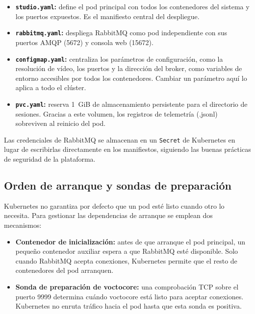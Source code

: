 \begin{itemize}
  \item \textbf{\texttt{studio.yaml}:} define el pod principal con todos los contenedores
        del sistema y los puertos expuestos. Es el manifiesto central del despliegue.
  \item \textbf{\texttt{rabbitmq.yaml}:} despliega RabbitMQ como pod independiente con
        sus puertos AMQP (5672) y consola web (15672).
  \item \textbf{\texttt{configmap.yaml}:} centraliza los parámetros de configuración,
        como la resolución de vídeo, los puertos y la dirección del broker, como
        variables de entorno accesibles por todos los contenedores. Cambiar un parámetro
        aquí lo aplica a todo el clúster.
  \item \textbf{\texttt{pvc.yaml}:} reserva 1~GiB de almacenamiento persistente para
        el directorio de sesiones. Gracias a este volumen, los registros de telemetría
        (.jsonl) sobreviven al reinicio del pod.
\end{itemize}

Las credenciales de RabbitMQ se almacenan en un \texttt{Secret} de Kubernetes en lugar
de escribirlas directamente en los manifiestos, siguiendo las buenas prácticas de
seguridad de la plataforma.

\subsection{Orden de arranque y sondas de preparación}

Kubernetes no garantiza por defecto que un pod esté listo cuando otro lo necesita.
Para gestionar las dependencias de arranque se emplean dos mecanismos:

\begin{itemize}
  \item \textbf{Contenedor de inicialización:} antes de que arranque el pod principal,
        un pequeño contenedor auxiliar espera a que RabbitMQ esté disponible. Solo
        cuando RabbitMQ acepta conexiones, Kubernetes permite que el resto de contenedores
        del pod arranquen.
  \item \textbf{Sonda de preparación de voctocore:} una comprobación TCP sobre el puerto
        9999 determina cuándo voctocore está listo para aceptar conexiones. Kubernetes
        no enruta tráfico hacia el pod hasta que esta sonda es positiva.
\end{itemize}

